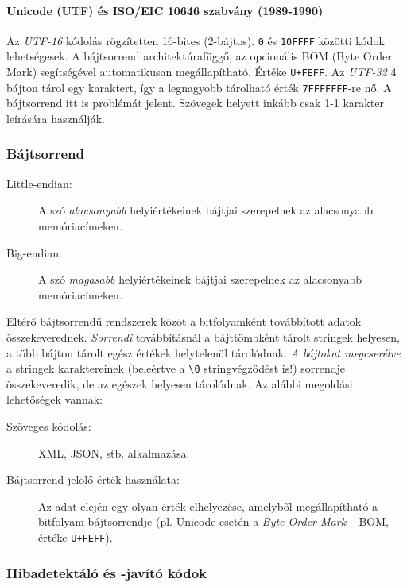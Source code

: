 \documentclass[a4paper]{article}
\begin{document}
\paragraph{Unicode (UTF) és ISO/EIC 10646 szabvány (1989-1990)} Az \emph{UTF-16} kódolás rögzítetten 16-bites (2-bájtos). \texttt{0} és \texttt{10FFFF} közötti kódok lehetségesek. A bájtsorrend architektúrafüggő, az opcionális BOM (Byte Order Mark) segítségével automatikusan megállapítható. Értéke \texttt{U+FEFF}. Az \emph{UTF-32} 4 bájton tárol egy karaktert, így a legnagyobb tárolható érték \texttt{7FFFFFFF}-re nő. A bájtsorrend itt is problémát jelent. Szövegek helyett inkább csak 1-1 karakter leírására használják.

\subsubsection{Bájtsorrend}

\begin{description}
	\item[Little-endian:] A szó \emph{alacsonyabb} helyiértékeinek bájtjai szerepelnek az alacsonyabb memóriacímeken.
	\item[Big-endian:] A szó \emph{magasabb} helyiértékeinek bájtjai szerepelnek az alacsonyabb memóriacímeken.
\end{description}

Eltérő bájtsorrendű rendszerek közöt a bitfolyamként továbbított adatok összekeverednek. \emph{Sorrendi} továbbításnál a bájttömbként tárolt stringek helyesen, a több bájton tárolt egész értékek helytelenül tárolódnak. \emph{A bájtokat megcserélve} a stringek karaktereinek (beleértve a \texttt{\textbackslash0} stringvégződést is!) sorrendje összekeveredik, de az egészek helyesen tárolódnak. Az alábbi megoldási lehetőségek vannak:
\begin{description}
	\item[Szöveges kódolás:] XML, JSON, stb. alkalmazása.
	\item[Bájtsorrend-jelölő érték használata:] Az adat elején egy olyan érték elhelyezése, amelyből megállapítható a bitfolyam bájtsorrendje (pl. Unicode esetén a \emph{Byte Order Mark} -- BOM, értéke \texttt{U+FEFF}).
\end{description}

\subsubsection{Hibadetektáló és -javító kódok}
\end{document}
